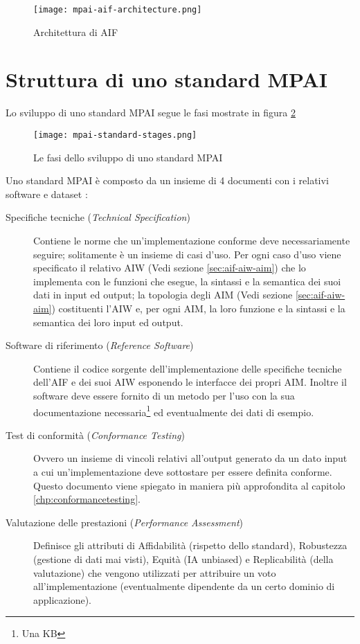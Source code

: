 \begin{figure}[h]
    \centering
    \texttt{[image: mpai-aif-architecture.png]}
    \caption{Architettura di \ac{AIF} \cite{leonardoBlogNewWayDevelop2020}}
    \label{fig:mpai-aif-architecture}
\end{figure}

\section{Struttura di uno standard MPAI} \label{sec:standard-mpai} %
Lo sviluppo di uno standard MPAI segue le fasi mostrate in figura \ref{fig:mpai-standard-stages}    %

\begin{figure}[h]
    \centering
    \texttt{[image: mpai-standard-stages.png]}
    \caption{Le fasi dello sviluppo di uno standard \ac{MPAI} \cite{leonardoBlogNewWayDevelop2020}}
    \label{fig:mpai-standard-stages}
\end{figure}

Uno standard \ac{MPAI} è composto da un insieme di 4 documenti con i relativi software e dataset \cite{mpaiStructureMPAIStandards}:
\begin{description}
    \item[Specifiche tecniche (\textit{Technical Specification})] Contiene le norme che un'implementazione conforme deve necessariamente seguire; solitamente è un insieme di casi d'uso. Per ogni caso d'uso viene specificato il relativo \ac{AIW} (Vedi sezione \ref{sec:aif-aiw-aim}) che lo implementa con le funzioni che esegue, la sintassi e la semantica dei suoi dati in input ed output; la topologia degli \ac{AIM} (Vedi sezione \ref{sec:aif-aiw-aim}) costituenti l'\ac{AIW} e, per ogni \ac{AIM}, la loro funzione e la sintassi e la semantica dei loro input ed output. 
    \item[Software di riferimento (\textit{Reference Software})] Contiene il codice sorgente dell'implementazione delle specifiche tecniche dell'\ac{AIF} e dei suoi \ac{AIW} esponendo le interfacce dei propri \ac{AIM}. Inoltre il software deve essere fornito di un metodo per l'uso con la sua documentazione necessaria\footnote{Una \ac{KB}} ed eventualmente dei dati di esempio.
    \item[Test di conformità (\textit{Conformance Testing})] Ovvero un insieme di vincoli relativi all'output generato da un dato input a cui un'implementazione deve sottostare per essere definita conforme. Questo documento viene spiegato in maniera più approfondita al capitolo \ref{chp:conformancetesting}.
    \item[Valutazione delle prestazioni (\textit{Performance Assessment})] Definisce gli attributi di Affidabilità (rispetto dello standard), Robustezza (gestione di dati mai visti), Equità (IA unbiased) e Replicabilità (della valutazione) che vengono utilizzati per attribuire un voto all'implementazione (eventualmente dipendente da un certo dominio di applicazione).
\end{description}

